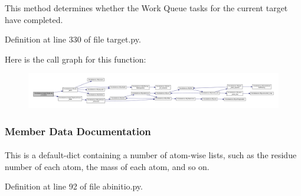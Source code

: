 \-This method determines whether the \-Work \-Queue tasks for the current target have completed. 



\-Definition at line 330 of file target.\-py.



\-Here is the call graph for this function\-:\nopagebreak
\begin{figure}[H]
\begin{center}
\leavevmode
\includegraphics[width=350pt]{classforcebalance_1_1target_1_1Target_af6099ec09486213869dba2491bd8ea04_cgraph}
\end{center}
\end{figure}




\subsubsection{\-Member \-Data \-Documentation}
\hypertarget{classforcebalance_1_1abinitio_1_1AbInitio_a3eceb701813ccb83d11a0dc71df835b7}{
\paragraph[{\-Atom\-Lists}]{}}\label{classforcebalance_1_1abinitio_1_1AbInitio_a3eceb701813ccb83d11a0dc71df835b7}


\-This is a default-\/dict containing a number of atom-\/wise lists, such as the residue number of each atom, the mass of each atom, and so on. 



\-Definition at line 92 of file abinitio.\-py.

